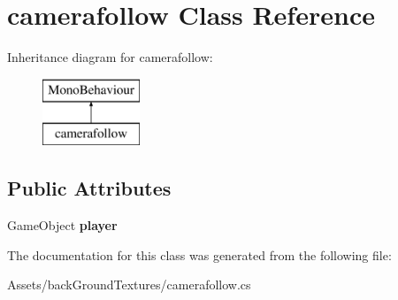 \hypertarget{classcamerafollow}{}\section{camerafollow Class Reference}
\label{classcamerafollow}
Inheritance diagram for camerafollow\+:\begin{figure}[H]
\begin{center}
\leavevmode
\includegraphics[height=2.000000cm]{classcamerafollow}
\end{center}
\end{figure}
\subsection*{Public Attributes}
\begin{DoxyCompactItemize}
\item 
\mbox{\label{classcamerafollow_a688b31a08c146c63b6a0c07a6b917b01}} 
Game\+Object {\bfseries player}
\end{DoxyCompactItemize}


The documentation for this class was generated from the following file\+:\begin{DoxyCompactItemize}
\item 
Assets/back\+Ground\+Textures/camerafollow.\+cs\end{DoxyCompactItemize}
